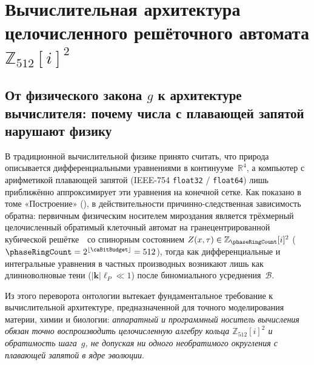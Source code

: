 \part{Вычислительная архитектура целочисленного решёточного автомата \texorpdfstring{$\mathbb{Z}_{512}[i]^2$}{Z\_512[i]\^2}}

\chapter{От физического закона \texorpdfstring{$g$}{g} к архитектуре вычислителя: почему числа с плавающей запятой нарушают физику}
\label{ch:compute-why-not-float}

В традиционной вычислительной физике принято считать, что природа описывается дифференциальными уравнениями в континууме~$\mathbb{R}^4$, а компьютер с арифметикой плавающей запятой (IEEE-754 \texttt{float32} / \texttt{float64}) лишь приближённо аппроксимирует эти уравнения на конечной сетке.
Как показано в томе «Построение» (), в действительности причинно-следственная зависимость обратна:
первичным физическим носителем мироздания является трёхмерный целочисленный обратимый клеточный автомат на гранецентрированной кубической решётке~\latGCK\ со спинорным состоянием $Z(x,\tau) \in \mathbb{Z}_{\phaseRingCount}[i]^2$ ($\phaseRingCount = 2^{\lfloor\caBitBudget\rfloor} = 512$), тогда как дифференциальные и интегральные уравнения в частных производных возникают лишь как длинноволновые тени ($|\mathbf{k}|\ell_P \ll 1$) после биномиального усреднения~$\mathcal{B}$.

Из этого переворота онтологии вытекает фундаментальное требование к вычислительной архитектуре, предназначенной для точного моделирования материи, химии и биологии:
\emph{аппаратный и программный носитель вычисления обязан точно воспроизводить целочисленную алгебру кольца $\mathbb{Z}_{512}[i]^2$ и обратимость шага~$g$, не допуская ни одного необратимого округления с плавающей запятой в ядре эволюции}.

